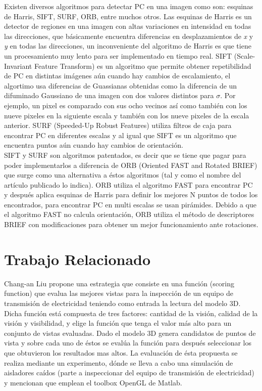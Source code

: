 \documentclass[]{report}
\begin{document}
Existen diversos algoritmos para detectar PC en una imagen como son: esquinas de Harris, SIFT, SURF, ORB, entre muchos otros. Las esquinas de Harris es un detector de regiones en una imagen con altas variaciones en intensidad en todas las direcciones, que básicamente encuentra diferencias en desplazamientos de \textit{x} y \textit{y} en todas las direcciones, un inconveniente del algoritmo de Harris es que tiene un procesamiento muy lento para ser implementado en tiempo real. SIFT (Scale-Invariant Feature Transform) es un algoritmo que permite obtener repetibilidad de PC en distintas imágenes aún cuando hay cambios de escalamiento, el algortimo usa diferencias de Guassianas obtenidas como la diferencia de un difuminado Gaussiano de una imagen con dos valores distintos para $\sigma$. Por ejemplo, un pixel es comparado con sus ocho vecinos así como también con los nueve pixeles en la siguiente escala y también con los nueve pixeles de la escala anterior. SURF (Speeded-Up Robust Features) utiliza filtros de caja para encontrar PC en diferentes escalas y al igual que SIFT es un algoritmo que encuentra puntos aún cuando hay cambios de orientación.\\
SIFT y SURF son algoritmos patentados, es decir que se tiene que pagar para poder implementarlos a diferencia de ORB (Oriented FAST and Rotated BRIEF) que surge como una alternativa a éstos algoritmos (tal y como el nombre del artículo publicado lo indica).  ORB utiliza el algoritmo FAST para encontrar PC y después aplica esquinas de Harris para definir los mejores N puntos de todos los encontrados, para encontrar PC en multi escalas se usan pirámides. Debido a que el algoritmo FAST no calcula orientación, ORB utiliza el método de descriptores BRIEF con modificaciones para obtener un mejor funcionamiento ante rotaciones.


\chapter{Trabajo Relacionado}
 Chang-an Liu \cite{liu2014flying} propone una estrategia que consiste en una función (scoring function) que evalua las mejores vistas para la inspección de un equipo de transmisión de electricidad teniendo como entrada la lectura del modelo 3D. Dicha función está compuesta de tres factores: cantidad de la visión, calidad de la visión y visibilidad, y elige la función que tenga el valor más alto para un conjunto de vistas evaluadas.  Dado el modelo 3D genera candidatos de puntos de vista y sobre cada uno de éstos se evalúa la función para después seleccionar los que obtuvieron los resultados mas altos. La evaluación de ésta propuesta se realiza mediante un experimento, dónde se lleva a cabo una simulación de aisladores caídos (parte a inspeccionar del equipo de transmisión de electricidad) y mencionan que emplean el toolbox OpenGL de Matlab. 
\end{document}
